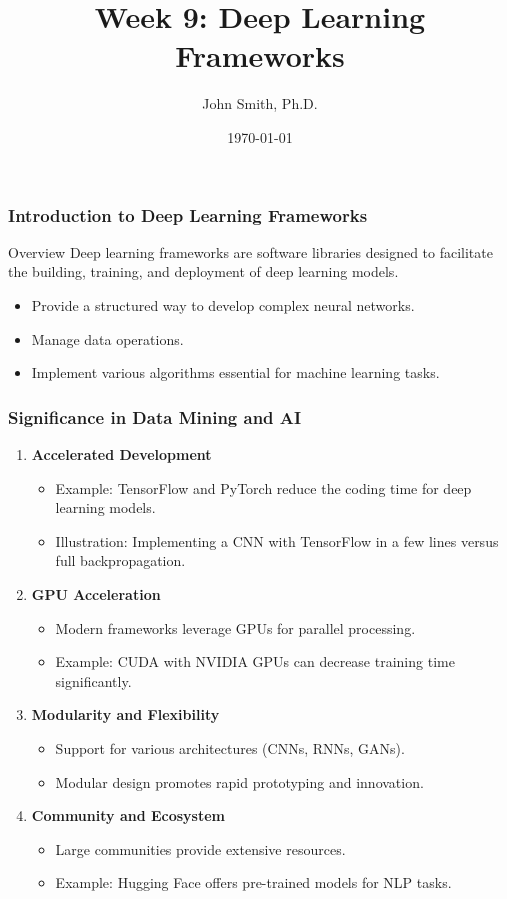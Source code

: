 \documentclass[aspectratio=169]{beamer}
\title[Deep Learning Frameworks]{Week 9: Deep Learning Frameworks}
\author[J. Smith]{John Smith, Ph.D.}
\institute[University Name]{
  Department of Computer Science\\
  University Name\\
  \vspace{0.3cm}
  Email: email@university.edu\\
  Website: www.university.edu
}
\date{\today}
\begin{document}
\frame{\titlepage}

\begin{frame}[fragile]
    \frametitle{Introduction to Deep Learning Frameworks}
    \begin{block}{Overview}
        Deep learning frameworks are software libraries designed to facilitate the building, training, and deployment of deep learning models.
    \end{block}
    
    \begin{itemize}
        \item Provide a structured way to develop complex neural networks.
        \item Manage data operations.
        \item Implement various algorithms essential for machine learning tasks.
    \end{itemize}
\end{frame}

\begin{frame}[fragile]
    \frametitle{Significance in Data Mining and AI}
    \begin{enumerate}
        \item \textbf{Accelerated Development}
            \begin{itemize}
                \item Example: TensorFlow and PyTorch reduce the coding time for deep learning models.
                \item Illustration: Implementing a CNN with TensorFlow in a few lines versus full backpropagation.
            \end{itemize}

        \item \textbf{GPU Acceleration}
            \begin{itemize}
                \item Modern frameworks leverage GPUs for parallel processing.
                \item Example: CUDA with NVIDIA GPUs can decrease training time significantly.
            \end{itemize}

        \item \textbf{Modularity and Flexibility}
            \begin{itemize}
                \item Support for various architectures (CNNs, RNNs, GANs).
                \item Modular design promotes rapid prototyping and innovation.
            \end{itemize}

        \item \textbf{Community and Ecosystem}
            \begin{itemize}
                \item Large communities provide extensive resources.
                \item Example: Hugging Face offers pre-trained models for NLP tasks.
            \end{itemize}
    \end{enumerate}
\end{frame}
\end{document}
